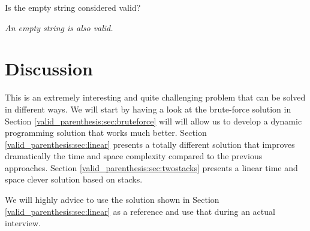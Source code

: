 \begin{QandA}
	\item \begin{questionitem} \begin{question} Is the empty string considered valid?  \end{question} 	 
    \begin{answered}
		\textit{An empty string is also valid.}
	\end{answered} \end{questionitem}
	
\end{QandA}

\section{Discussion}
\label{valid_parenthesis:sec:discussion}
This is an extremely interesting and quite challenging problem that can be solved in different ways. We will start by having a look at the brute-force solution in Section \ref{valid_parenthesis:sec:bruteforce} will will allow us to develop a dynamic programming solution that works much better. Section \ref{valid_parenthesis:sec:linear} presents a totally different solution that improves dramatically the time and space complexity compared to the previous approaches. Section \ref{valid_parenthesis:sec:twostacks} presents a linear time and space clever solution based on stacks.

We will highly advice to use the solution shown in Section \ref{valid_parenthesis:sec:linear} as a reference and use that during an actual interview.

